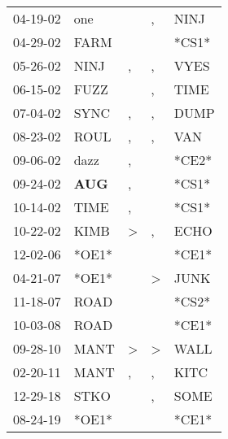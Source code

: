\begin{supertabular}{p{0.07\textwidth}p{0.06\textwidth}p{0.02\textwidth}p{0.02\textwidth}p{0.06\textwidth}}
 04-19-02\textsuperscript{} &           one\textsuperscript{} &               &             , &           NINJ\textsuperscript{} \\
 04-29-02\textsuperscript{} &          FARM\textsuperscript{} &               &               &                            *CS1* \\
 05-26-02\textsuperscript{} &          NINJ\textsuperscript{} &             , &             , &           VYES\textsuperscript{} \\
 06-15-02\textsuperscript{} &          FUZZ\textsuperscript{} &               &             , &           TIME\textsuperscript{} \\
 07-04-02\textsuperscript{} &          SYNC\textsuperscript{} &             , &             , &           DUMP\textsuperscript{} \\
 08-23-02\textsuperscript{} &          ROUL\textsuperscript{} &             , &             , &            VAN\textsuperscript{} \\
 09-06-02\textsuperscript{} &          dazz\textsuperscript{} &             , &               &                            *CE2* \\
 09-24-02\textsuperscript{} &  \textbf{AUG\textsuperscript{}} &             , &               &                            *CS1* \\
 10-14-02\textsuperscript{} &          TIME\textsuperscript{} &             , &               &                            *CS1* \\
 10-22-02\textsuperscript{} &          KIMB\textsuperscript{} &  \textgreater &             , &           ECHO\textsuperscript{} \\
 12-02-06\textsuperscript{} &                           *OE1* &               &               &                            *CE1* \\
 04-21-07\textsuperscript{} &                           *OE1* &               &  \textgreater &           JUNK\textsuperscript{} \\
 11-18-07\textsuperscript{} &          ROAD\textsuperscript{} &               &               &                            *CS2* \\
 10-03-08\textsuperscript{} &          ROAD\textsuperscript{} &               &               &                            *CE1* \\
 09-28-10\textsuperscript{} &          MANT\textsuperscript{} &  \textgreater &  \textgreater &           WALL\textsuperscript{} \\
 02-20-11\textsuperscript{} &          MANT\textsuperscript{} &             , &             , &           KITC\textsuperscript{} \\
 12-29-18\textsuperscript{} &          STKO\textsuperscript{} &               &             , &           SOME\textsuperscript{} \\
 08-24-19\textsuperscript{} &                           *OE1* &               &               &                            *CE1* \\
\end{supertabular}
